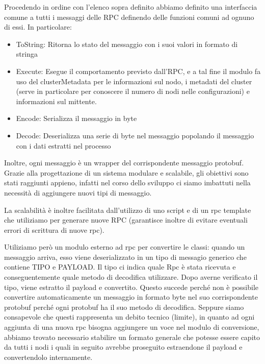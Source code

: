 Procedendo in ordine con l'elenco sopra definito abbiamo definito una interfaccia comune
a tutti i messaggi delle RPC definendo delle funzioni comuni ad ognuno di essi. In particolare:
\begin{itemize}
  \item ToString: Ritorna lo stato del messaggio con i suoi valori in formato di stringa
  \item Execute: Esegue il comportamento previsto dall'RPC, e a tal fine il modulo fa uso 
    del clusterMetadata per le informazioni sul nodo, i metadati 
    del cluster (serve in particolare per conoscere 
    il numero di nodi nelle configurazioni) e informazioni sul mittente.
  \item Encode: Serializza il messaggio in byte
  \item Decode: Deserializza una serie di byte nel messaggio popolando il messaggio 
     con i dati estratti nel processo
\end{itemize}
Inoltre, ogni messaggio è un wrapper del corrispondente messaggio protobuf. \\
Grazie alla progettazione di un sistema modulare e scalabile, gli obiettivi sono stati raggiunti 
appieno, infatti nel corso dello sviluppo ci siamo imbattuti nella necessità di aggiungere nuovi 
tipi di messaggio. 

La scalabilità è inoltre facilitata dall'utilizzo di uno script e di un rpc template 
che utiliziamo per generare nuove RPC (garantisce inoltre di evitare eventuali errori di 
scrittura di nuove rpc). 

Utiliziamo però un modulo esterno ad rpc per convertire le classi: quando un messaggio 
arriva, esso viene deserializzato in un tipo di messagio generico che contiene TIPO e PAYLOAD. 
Il tipo ci indica quale Rpc è stata ricevuta e conseguentemente quale metodo di decodifica 
utilizzare. 
Dopo averne verificato il tipo, viene estratto il payload e convertito. 
Questo succede perché non è possibile convertire automaticamente un messaggio in formato byte 
nel suo 
corrispondente protobuf perché ogni protobuf ha il suo metodo di decodifica. Seppure siamo 
consapevole che questi rappresenta un debito tecnico (limite), in quanto ad ogni aggiunta di 
una nuova rpc bisogna aggiungere un voce nel modulo di conversione, abbiamo trovato 
necessario stabilire un formato generale che potesse essere capito da tutti i nodi i quali 
in seguito avrebbe proseguito estraendone il payload e convertendolo internamente.

